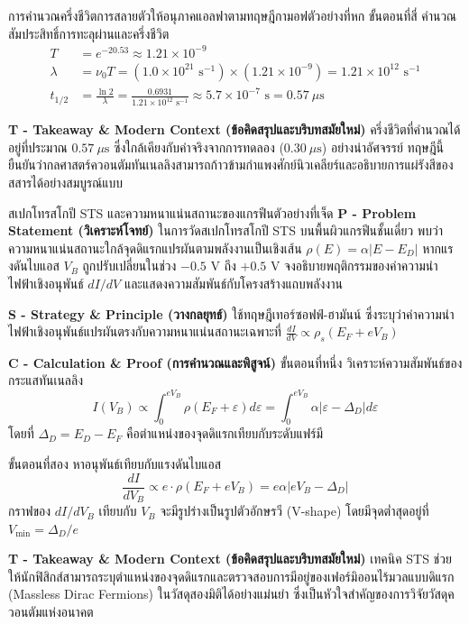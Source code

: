 \begin{psctbox}{การคำนวณครึ่งชีวิตการสลายตัวให้อนุภาคแอลฟาตามทฤษฎีกามอฟ}{ตัวอย่างที่หก}
ขั้นตอนที่สี่ คำนวณสัมประสิทธิ์การทะลุผ่านและครึ่งชีวิต
\begin{align}
T &= e^{-20.53} \approx 1.21 \times 10^{-9} \\
\lambda &= \nu_0 T = (1.0 \times 10^{21}\text{ s}^{-1}) \times (1.21 \times 10^{-9}) = 1.21 \times 10^{12}\text{ s}^{-1} \\
t_{1/2} &= \frac{\ln 2}{\lambda} = \frac{0.6931}{1.21 \times 10^{12}\text{ s}^{-1}} \approx 5.7 \times 10^{-7}\text{ s} = 0.57\ \mu\text{s}
\end{align}

\vspace{6pt}
\noindent\textbf{T - Takeaway \& Modern Context (ข้อคิดสรุปและบริบทสมัยใหม่)} ครึ่งชีวิตที่คำนวณได้อยู่ที่ประมาณ $0.57\ \mu\text{s}$ ซึ่งใกล้เคียงกับค่าจริงจากการทดลอง ($0.30\ \mu\text{s}$) อย่างน่าอัศจรรย์ ทฤษฎีนี้ยืนยันว่ากลศาสตร์ควอนตัมทันเนลลิงสามารถก้าวข้ามกำแพงศักย์นิวเคลียร์และอธิบายการแผ่รังสีของสสารได้อย่างสมบูรณ์แบบ
\end{psctbox}

\begin{psctbox}{สเปกโทรสโกปี STS และความหนาแน่นสถานะของแกรฟีน}{ตัวอย่างที่เจ็ด}
\noindent\textbf{P - Problem Statement (วิเคราะห์โจทย์)} ในการวัดสเปกโทรสโกปี STS บนพื้นผิวแกรฟีนชั้นเดี่ยว พบว่าความหนาแน่นสถานะใกล้จุดดิแรกแปรผันตามพลังงานเป็นเชิงเส้น $\rho(E) = \alpha |E - E_D|$ หากแรงดันไบแอส $V_B$ ถูกปรับเปลี่ยนในช่วง $-0.5\text{ V}$ ถึง $+0.5\text{ V}$ จงอธิบายพฤติกรรมของค่าความนำไฟฟ้าเชิงอนุพันธ์ $dI/dV$ และแสดงความสัมพันธ์กับโครงสร้างแถบพลังงาน

\vspace{6pt}
\noindent\textbf{S - Strategy \& Principle (วางกลยุทธ์)} ใช้ทฤษฎีเทอร์ซอฟฟ์-ฮามันน์ ซึ่งระบุว่าค่าความนำไฟฟ้าเชิงอนุพันธ์แปรผันตรงกับความหนาแน่นสถานะเฉพาะที่ $\frac{dI}{dV} \propto \rho_s(E_F + e V_B)$

\vspace{6pt}
\noindent\textbf{C - Calculation \& Proof (การคำนวณและพิสูจน์)}
ขั้นตอนที่หนึ่ง วิเคราะห์ความสัมพันธ์ของกระแสทันเนลลิง
\begin{equation}
I(V_B) \propto \int_0^{e V_B} \rho(E_F + \varepsilon) d\varepsilon = \int_0^{e V_B} \alpha |\varepsilon - \Delta_D| d\varepsilon
\end{equation}
โดยที่ $\Delta_D = E_D - E_F$ คือตำแหน่งของจุดดิแรกเทียบกับระดับแฟร์มี

ขั้นตอนที่สอง หาอนุพันธ์เทียบกับแรงดันไบแอส
\begin{equation}
\frac{dI}{dV_B} \propto e \cdot \rho(E_F + e V_B) = e \alpha |e V_B - \Delta_D|
\end{equation}
กราฟของ $dI/dV_B$ เทียบกับ $V_B$ จะมีรูปร่างเป็นรูปตัวอักษรวี (V-shape) โดยมีจุดต่ำสุดอยู่ที่ $V_{\text{min}} = \Delta_D / e$

\vspace{6pt}
\noindent\textbf{T - Takeaway \& Modern Context (ข้อคิดสรุปและบริบทสมัยใหม่)} เทคนิค STS ช่วยให้นักฟิสิกส์สามารถระบุตำแหน่งของจุดดิแรกและตรวจสอบการมีอยู่ของเฟอร์มิออนไร้มวลแบบดิแรก (Massless Dirac Fermions) ในวัสดุสองมิติได้อย่างแม่นยำ ซึ่งเป็นหัวใจสำคัญของการวิจัยวัสดุควอนตัมแห่งอนาคต
\end{psctbox}

